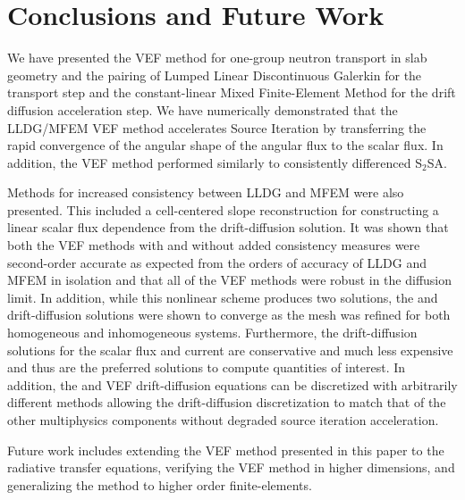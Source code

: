 
\section{Conclusions and Future Work}
We have presented the VEF method for one-group neutron transport in slab geometry and the pairing of Lumped Linear Discontinuous Galerkin for the \SN transport step and the constant-linear Mixed Finite-Element Method for the drift diffusion acceleration step. We have numerically demonstrated that the LLDG/MFEM VEF method accelerates Source Iteration by transferring the rapid convergence of the angular shape of the angular flux to the scalar flux. In addition, the VEF method performed similarly to consistently differenced S$_2$SA. 

Methods for increased consistency between LLDG and MFEM were also presented. This included a cell-centered slope reconstruction for constructing a linear scalar flux dependence from the drift-diffusion solution. It was shown that both the VEF methods with and without added consistency measures were second-order accurate as expected from the orders of accuracy of LLDG and MFEM in isolation and that all of the VEF methods were robust in the diffusion limit. In addition, while this nonlinear scheme produces two solutions, the \SN and drift-diffusion solutions were shown to converge as the mesh was refined for both homogeneous and inhomogeneous systems. Furthermore, the drift-diffusion solutions for the scalar flux and current are conservative and much less expensive and thus are the preferred solutions to compute quantities of interest. In addition, the \SN and VEF drift-diffusion equations can be discretized with arbitrarily different methods allowing the drift-diffusion discretization to match that of the other multiphysics components without degraded source iteration acceleration. 


Future work includes extending the VEF method presented in this paper to the radiative transfer equations, verifying the VEF method in higher dimensions, and generalizing the method to higher order finite-elements. 